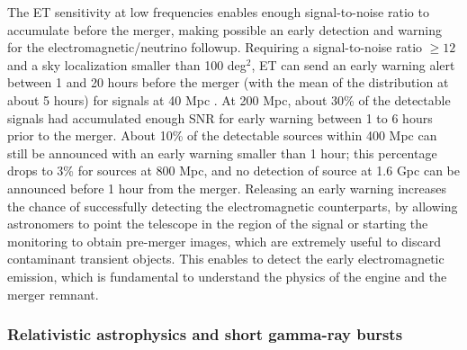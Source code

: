 The ET sensitivity at low frequencies enables enough signal-to-noise ratio to accumulate before the merger, making possible an early detection and warning for the electromagnetic/neutrino followup. Requiring a signal-to-noise ratio  $\geq 12$ and a sky localization smaller than 100 deg$^2$, ET can send an early warning alert between 1 and 20 hours before the merger (with the mean of the distribution at about 5 hours) for signals at 40 Mpc \cite{Chan2018}. At 200 Mpc, about 30\% of the detectable signals had accumulated enough SNR for early warning between 1 to 6 hours prior to the merger. About 10\% of the detectable sources within 400 Mpc can still be announced with an early warning smaller than 1 hour; this percentage drops to 3\% for sources at 800 Mpc, and  no detection of source at 1.6 Gpc can be announced before 1 hour from the merger. Releasing an early warning increases the chance of successfully detecting the electromagnetic counterparts, by allowing astronomers to point the telescope in the region of the signal or starting the monitoring to obtain pre-merger images, which are extremely useful to discard contaminant transient objects. This enables to detect the early electromagnetic emission, which is fundamental to understand the physics of the engine and the merger remnant.




\subsubsection{Relativistic astrophysics and short gamma-ray bursts}

